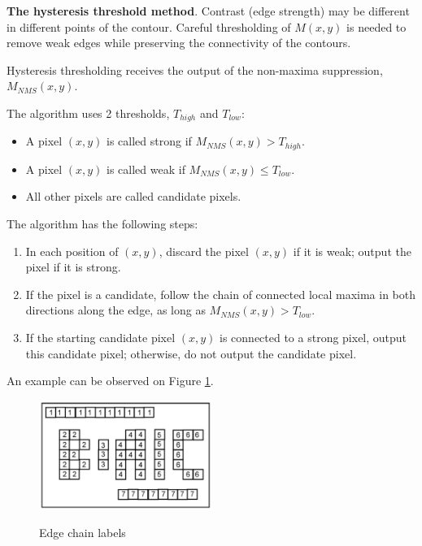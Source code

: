 \documentclass[letterpaper,12pt]{article}
\begin{document}
  
\textbf{The hysteresis threshold method}.
Contrast (edge strength) may be different in different points of the contour. Careful thresholding of $M(x,y)$ is needed to remove  weak edges while preserving the connectivity of the contours.

Hysteresis thresholding receives the output of the non-maxima suppression, $M_{NMS}(x,y)$.

The algorithm uses 2 thresholds, $T_{high}$ and $T_{low}$:

\begin{itemize}
	\item A pixel $(x,y)$ is called strong if $M_{NMS}(x,y) > T_{high}$.
	\item A pixel $(x,y)$ is called weak if $M_{NMS}(x,y) \leq T_{low}$.
	\item All other pixels are called candidate pixels.
\end{itemize}

The algorithm has the following steps:
\begin{enumerate}


	\item  In each position of $(x,y)$, discard the pixel $(x,y)$ if it is weak; output the pixel if it is strong.
	\item If the pixel is a candidate, follow the chain of connected local maxima in both directions along the edge, as long as $M_{NMS}(x,y) > T_{low}$.
	\item If the starting candidate pixel $(x,y)$ is connected to a strong pixel, output this candidate pixel; otherwise, do not output the candidate pixel.
\end{enumerate}

An example can be observed on Figure \ref{fig:edge_chain_labs}.

\begin{figure}[!th]
  \centering
  {\includegraphics[width=0.5\textwidth]{edge_chain_labs}}

    \caption{Edge chain labels  	\label{fig:edge_chain_labs}}
  \end{figure}
\end{document}
